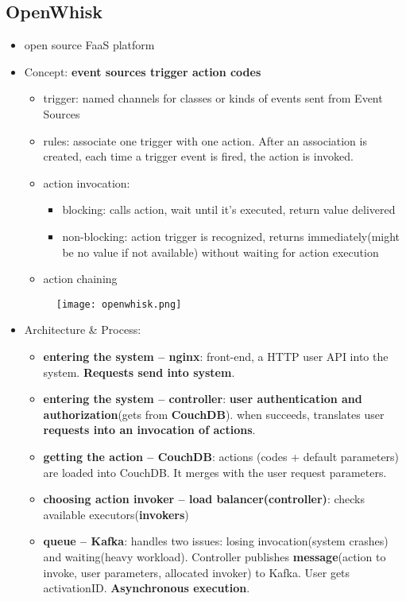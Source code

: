 \subsection{OpenWhisk}
\begin{itemize}
	\item open source FaaS platform
	\item Concept: \textbf{event sources trigger action codes}
	\begin{itemize}
		\item trigger: named channels for classes or kinds of events sent from Event Sources
		\item rules: associate one trigger with one action. After an association is created, each time a trigger event is fired, the action is invoked.
		\item action invocation: 
		\begin{itemize}
			\item blocking: calls action, wait until it's executed, return value delivered
			\item non-blocking: action trigger is recognized, returns immediately(might be no value if not available) without waiting for action execution 
		\end{itemize}
		\item action chaining
	\end{itemize}
	\begin{figure}[H]
		\centering
		\texttt{[image: openwhisk.png]}
	\end{figure}
	\item Architecture \& Process: 
	\begin{itemize}
		\item \textbf{entering the system -- nginx}: front-end, a HTTP user API into the system. \textbf{Requests send into system}.		
		\item \textbf{entering the system -- controller}: \textbf{user authentication and authorization}(gets from \textbf{CouchDB}). when succeeds, translates user \textbf{requests into an invocation of actions}.
		\item \textbf{getting the action -- CouchDB}: actions (codes + default parameters) are loaded into CouchDB. It merges with the user request parameters.
		\item \textbf{choosing action invoker -- load balancer(controller)}: checks available executors(\textbf{invokers})
		\item \textbf{queue -- Kafka}: handles two issues: losing invocation(system crashes) and waiting(heavy workload). Controller publishes \textbf{message}(action to invoke, user parameters, allocated invoker) to Kafka. User gets activationID. \textbf{Asynchronous execution}.

\end{itemize}
\end{itemize}
